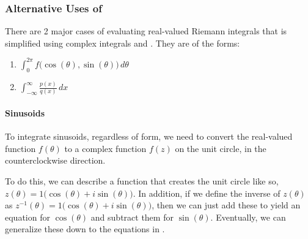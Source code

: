 \subsubsection{Alternative Uses of }\label{subsubsec:Alternative_Uses_Cauchys_Residue_Theorem}
There are 2 major cases of evaluating real-valued Riemann integrals that is simplified using complex integrals and .
They are of the forms:
\begin{enumerate}[noitemsep]
\item $\int_{0}^{2\pi} f \bigl( \cos(\theta), \sin(\theta) \bigr) \, d\theta$
\item $\int_{-\infty}^{\infty} \frac{p(x)}{q(x)} \, dx$
\end{enumerate}

\paragraph{Sinusoids}\label{par:Sinusoids_Cauchys_Residue_Theorem}
To integrate sinusoids, regardless of form, we need to convert the real-valued function $f(\theta)$ to a complex function $f(z)$ on the unit circle, in the counterclockwise direction.

To do this, we can describe a function that creates the unit circle like so, $z(\theta) = 1 \bigl( \cos(\theta) + i \sin(\theta) \bigr)$.
In addition, if we define the inverse of $z(\theta)$ as $z^{-1}(\theta) = 1 \bigl( \cos(\theta) + i \sin(\theta) \bigr)$, then we can just add these to yield an equation for $\cos(\theta)$ and subtract them for $\sin(\theta)$.
Eventually, we can generalize these down to the equations in .

